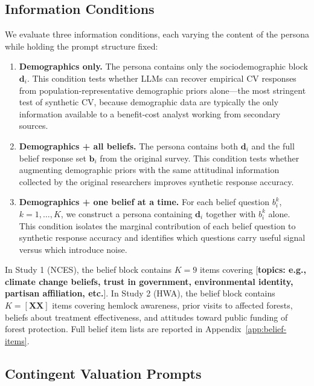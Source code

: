 \documentclass[12pt]{article}
\begin{document}
\subsection{Information Conditions}\label{sec:methods-conditions}

We evaluate three information conditions, each varying the content of the persona while holding the prompt structure fixed:

\begin{enumerate}
    \item \textbf{Demographics only.} The persona contains only the sociodemographic block $\mathbf{d}_i$. This condition tests whether LLMs can recover empirical CV responses from population-representative demographic priors alone---the most stringent test of synthetic CV, because demographic data are typically the only information available to a benefit-cost analyst working from secondary sources.
    \item \textbf{Demographics + all beliefs.} The persona contains both $\mathbf{d}_i$ and the full belief response set $\mathbf{b}_i$ from the original survey. This condition tests whether augmenting demographic priors with the same attitudinal information collected by the original researchers improves synthetic response accuracy.
    \item \textbf{Demographics + one belief at a time.} For each belief question $b_i^k$, $k = 1, \dots, K$, we construct a persona containing $\mathbf{d}_i$ together with $b_i^k$ alone. This condition isolates the marginal contribution of each belief question to synthetic response accuracy and identifies which questions carry useful signal versus which introduce noise.
\end{enumerate}

In Study 1 (NCES), the belief block contains $K = 9$ items covering [\textbf{topics: e.g., climate change beliefs, trust in government, environmental identity, partisan affiliation, etc.}]. In Study 2 (HWA), the belief block contains $K = [\textbf{XX}]$ items covering hemlock awareness, prior visits to affected forests, beliefs about treatment effectiveness, and attitudes toward public funding of forest protection. Full belief item lists are reported in Appendix~\ref{app:belief-items}.

\subsection{Contingent Valuation Prompts}\label{sec:methods-cv-prompts}
\end{document}
